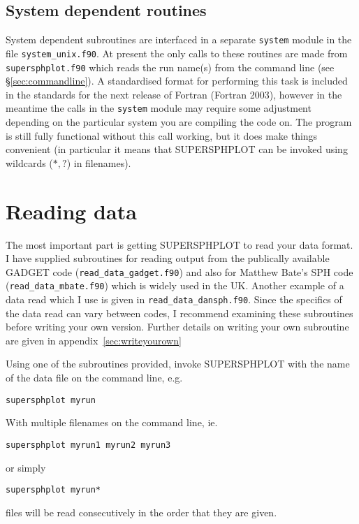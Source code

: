 \documentclass[a4paper,12pt]{article}
\begin{document}
\subsection{System dependent routines}
 System dependent subroutines are interfaced in a separate \verb+system+ module in the file \verb+system_unix.f90+.
At present the only calls to these routines are made from \verb+supersphplot.f90+ which
reads the run name(s) from the command line (see \S\vref{sec:commandline}). A standardised format for performing this
task is included in the standards for the next release of Fortran (Fortran 2003),
however in the meantime the calls in the \verb+system+ module may require some adjustment depending on the
particular system you are compiling the code on. The program is still fully
functional without this call working, but it does make things convenient (in particular it means that
SUPERSPHPLOT can be invoked using wildcards ($*,?$) in filenames).

\section{Reading data}
 The most important part is getting SUPERSPHPLOT to read your data format. I
have supplied subroutines for reading output from the publically available
GADGET code (\verb+read_data_gadget.f90+) and also for Matthew Bate's SPH code
(\verb+read_data_mbate.f90+) which is widely used in the UK. Another example of a
data read which I use is given in \verb+read_data_dansph.f90+.
 Since the specifics of the data read can
vary between codes, I recommend examining these subroutines before writing your
own version. Further details on writing your own subroutine are given in
appendix~\ref{sec:writeyourown}

 Using one of the subroutines provided, invoke SUPERSPHPLOT with the name of the data
file on the command line, e.g.
\begin{verbatim}
supersphplot myrun
\end{verbatim}
With multiple filenames on the command line, ie.
\begin{verbatim}
supersphplot myrun1 myrun2 myrun3
\end{verbatim}
or simply
\begin{verbatim}
supersphplot myrun*
\end{verbatim}
files will be read consecutively in the order that they are given.
\end{document}
